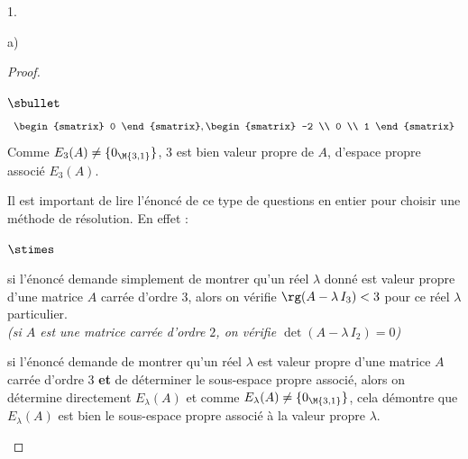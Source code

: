 \documentclass[11pt]{article}%
\begin{document}
\begin{noliste}{1.}
\begin{noliste}{a)}
\begin{proof}
\begin{noliste}{$\sbullet$}
\[\begin{array}{rcl}
{\begin{smatrix}
              0
            \end{smatrix}
            ,
            \begin{smatrix}
              -2 \\
              0 \\
              1
            \end{smatrix}
          }
        \end{array}
        \]   
        Comme $E_3(A) \neq \{0_{\M{3,1}}\}$, $3$ est bien valeur
        propre de $A$, d'espace propre associé $E_3(A)$.%
        \begin{remarkL}{.97}%
          Il est important de lire l'énoncé de ce type de questions en
          entier pour choisir une méthode de résolution. En effet :
          \begin{noliste}{$\stimes$}
          \item si l'énoncé demande simplement de montrer qu'un réel
            $\lambda$ donné est valeur propre d'une matrice $A$ carrée
            d'ordre $3$, alors on vérifie $\rg(A-\lambda \, I_3) < 3$
            pour ce réel $\lambda$ particulier.\\
            {\it (si $A$ est une matrice carrée d'ordre $2$, on
              vérifie $\det(A-\lambda \, I_2) = 0$)}
          \item si l'énoncé demande de montrer qu'un réel $\lambda$
            est valeur propre d'une matrice $A$ carrée d'ordre $3$
            {\bf et} de déterminer le sous-espace propre associé,
            alors on détermine directement $E_\lambda(A)$ et comme
            $E_\lambda(A) \neq \{0_{\M{3,1}}\}$, cela démontre que
            $E_\lambda(A)$ est bien le sous-espace propre associé à la
            valeur propre $\lambda$.
          \end{noliste}
        \end{remarkL}


        \newpage



\end{noliste}
\end{proof}
\end{noliste}
\end{noliste}
\end{document}
